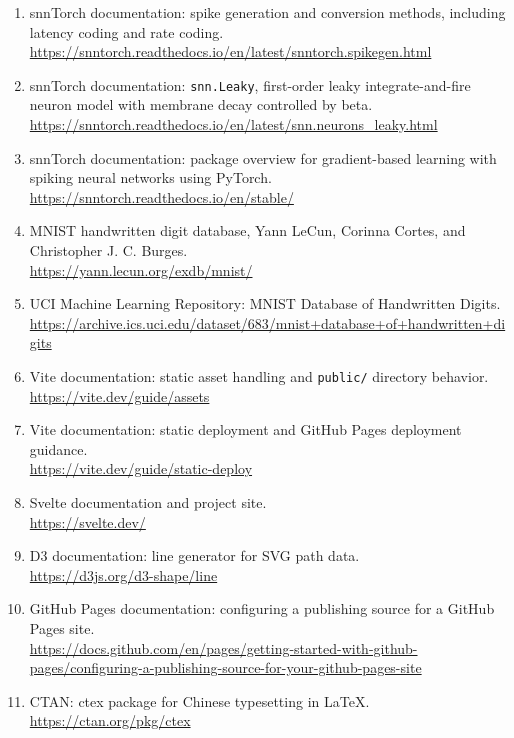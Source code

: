 \documentclass[UTF8,11pt,a4paper]{ctexart}
\begin{document}
\begin{enumerate}
    \item snnTorch documentation: spike generation and conversion methods, including latency coding and rate coding.\\
    \url{https://snntorch.readthedocs.io/en/latest/snntorch.spikegen.html}

    \item snnTorch documentation: \texttt{snn.Leaky}, first-order leaky integrate-and-fire neuron model with membrane decay controlled by beta.\\
    \url{https://snntorch.readthedocs.io/en/latest/snn.neurons_leaky.html}

    \item snnTorch documentation: package overview for gradient-based learning with spiking neural networks using PyTorch.\\
    \url{https://snntorch.readthedocs.io/en/stable/}

    \item MNIST handwritten digit database, Yann LeCun, Corinna Cortes, and Christopher J. C. Burges.\\
    \url{https://yann.lecun.org/exdb/mnist/}

    \item UCI Machine Learning Repository: MNIST Database of Handwritten Digits.\\
    \url{https://archive.ics.uci.edu/dataset/683/mnist+database+of+handwritten+digits}

    \item Vite documentation: static asset handling and \texttt{public/} directory behavior.\\
    \url{https://vite.dev/guide/assets}

    \item Vite documentation: static deployment and GitHub Pages deployment guidance.\\
    \url{https://vite.dev/guide/static-deploy}

    \item Svelte documentation and project site.\\
    \url{https://svelte.dev/}

    \item D3 documentation: line generator for SVG path data.\\
    \url{https://d3js.org/d3-shape/line}

    \item GitHub Pages documentation: configuring a publishing source for a GitHub Pages site.\\
    \url{https://docs.github.com/en/pages/getting-started-with-github-pages/configuring-a-publishing-source-for-your-github-pages-site}

    \item CTAN: ctex package for Chinese typesetting in LaTeX.\\
    \url{https://ctan.org/pkg/ctex}
\end{enumerate}
\end{document}
